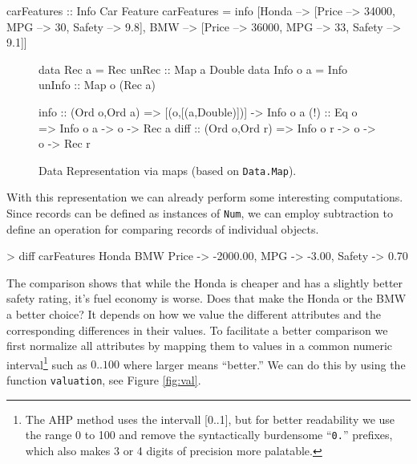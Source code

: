 \documentclass{jfp}
\newcommand{\NOTE}[2][gray]{\smallskip\noindent
  \colorbox{#1!30}{\parbox{.98\linewidth}{{\small\textbf{#2}}}}
}
\newcommand{\prog}[1]{\texttt{#1}}
\newcommand{\prg}[2][blue]{\color{#1}\texttt{{\footnotesize #2}}\color{black}}
\begin{document}
\begin{haskellcode}
carFeatures :: Info Car Feature
carFeatures = info [Honda --> [Price --> 34000, MPG --> 30, Safety --> 9.8],
                    BMW   --> [Price --> 36000, MPG --> 33, Safety --> 9.1]]
\end{haskellcode}


\begin{figure}[t]
\begin{haskellcode}
data Rec    a = Rec  {unRec  :: Map a Double}
data Info o a = Info {unInfo :: Map o (Rec a)}

info :: (Ord o,Ord a) => [(o,[(a,Double)])] -> Info o a
(!)  :: Eq o          => Info o a -> o      -> Rec a
diff :: (Ord o,Ord r) => Info o r -> o -> o -> Rec r
\end{haskellcode}
%
%
%
%
%
%
%
\caption{Data Representation via maps (based on \prg{Data.Map}).}
\label{fig:info}
\end{figure}

\noindent
%
With this representation we can already perform some interesting computations. Since records can be defined as instances of \prog{Num}, we can employ subtraction to define an operation for comparing records of individual objects.

\begin{haskellcode}
> diff carFeatures Honda BMW
{Price -> -2000.00, MPG -> -3.00, Safety -> 0.70}
\end{haskellcode}

\noindent
%
The comparison shows that while the Honda is cheaper and has a slightly better safety rating, it's fuel economy is worse.
%
Does that make the Honda or the BMW a better choice? It depends on how we value the different attributes and the corresponding differences in their values. To facilitate a better comparison we first normalize all attributes by mapping them to values in a common numeric interval\footnote{The AHP method uses the intervall [0..1], but for better readability we use the range 0 to 100 and remove the syntactically burdensome ``\prog{0.}'' prefixes, which also makes 3 or 4 digits of precision more palatable.} such as $0..100$ where larger means ``better.'' We can do this by using the function \prog{valuation}, see Figure \ref{fig:val}.
%
\end{document}
